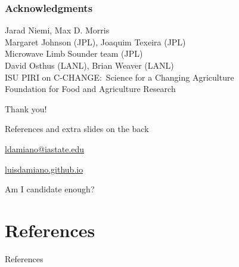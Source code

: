 \documentclass[handout]{snedecorbeamer}
\begin{document}
\begin{frame}[c]
  \frametitle{Acknowledgments}
  \centering

  {\small Jarad Niemi, Max D. Morris\\
    Margaret Johnson (JPL), Joaquim Texeira (JPL) \\
    Microwave Limb Sounder team (JPL)\\
    David Osthus (LANL), Brian Weaver (LANL) \\
    ISU PIRI on C-CHANGE:~Science for a Changing Agriculture\\
    Foundation for Food and Agriculture Research}

  \vfill

  {\huge Thank you!}

  \vfill

  {\tiny References and extra slides on the back}

  \href{ldamiano@iastate.edu}{
    ldamiano@iastate.edu}

  \href{https://luisdamiano.github.io/}{
    luisdamiano.github.io}

  \vfill

  {\tiny Am I candidate enough?}

\end{frame}

\appendix

\section{References}


\begin{frame}[allowframebreaks]{References}
  \tiny
  
  
\end{frame}
\end{document}
